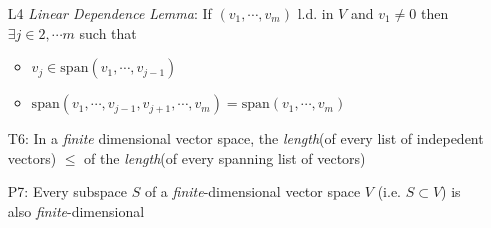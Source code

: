 \documentclass[11pt,notitlepage,oneside]{article}
\begin{document}
\begin{itemize}
\item[L4]\emph{Linear Dependence Lemma}: If $(v_1, \cdots, v_m)$ l.d. in $V$ and $v_1\neq 0$ then $\exists j\in 2,\cdots m$ such that
\begin{itemize}
  \item $v_j \in \mathrm{span}(v_1,\cdots, v_{j-1})$
  \item  $\mathrm{span}(v_1,\cdots, v_{j-1}, v_{j+1}, \cdots, v_m) = \mathrm{span}(v_1,\cdots, v_m)$
\end{itemize}
\item[T6:\label{it:T2_6}] In a \emph{finite} dimensional vector space, the \emph{length}(of every list of indepedent vectors) $\leq$ of the \emph{length}(of every spanning list of vectors)
\item[P7:] Every subspace $S$ of a \emph{finite}-dimensional vector space $V$ (i.e. $S\subset V$) is also \emph{finite}-dimensional
%


\end{itemize}
\end{document}
